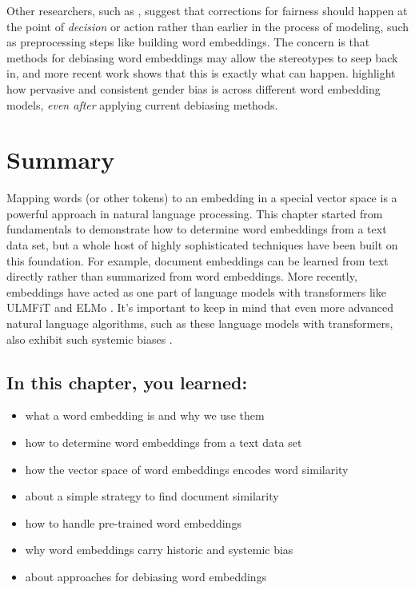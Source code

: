 \documentclass[
]{krantz}
\begin{document}
Other researchers, such as \citet{Caliskan2016}, suggest that corrections for fairness should happen at the point of \emph{decision} or action rather than earlier in the process of modeling, such as preprocessing steps like building word embeddings. The concern is that methods for debiasing word embeddings may allow the stereotypes to seep back in, and more recent work shows that this is exactly what can happen. \citet{Gonen2019} highlight how pervasive and consistent gender bias is across different word embedding models, \emph{even after} applying current debiasing methods.

\hypertarget{embeddingssummary}{%
\section{Summary}\label{embeddingssummary}}

Mapping words (or other tokens) to an embedding in a special vector space is a powerful approach in natural language processing. This chapter started from fundamentals to demonstrate how to determine word embeddings from a text data set, but a whole host of highly sophisticated techniques have been built on this foundation. For example, document embeddings can be learned from text directly \citep{Le2014} rather than summarized from word embeddings. More recently, embeddings have acted as one part of language models with transformers like ULMFiT \citep{Howard2018} and ELMo \citep{Peters2018}. It's important to keep in mind that even more advanced natural language algorithms, such as these language models with transformers, also exhibit such systemic biases \citep{Sheng2019}.

\hypertarget{in-this-chapter-you-learned-4}{%
\subsection{In this chapter, you learned:}\label{in-this-chapter-you-learned-4}}

\begin{itemize}
\item
  what a word embedding is and why we use them
\item
  how to determine word embeddings from a text data set
\item
  how the vector space of word embeddings encodes word similarity
\item
  about a simple strategy to find document similarity
\item
  how to handle pre-trained word embeddings
\item
  why word embeddings carry historic and systemic bias
\item
  about approaches for debiasing word embeddings
\end{itemize}
\end{document}

